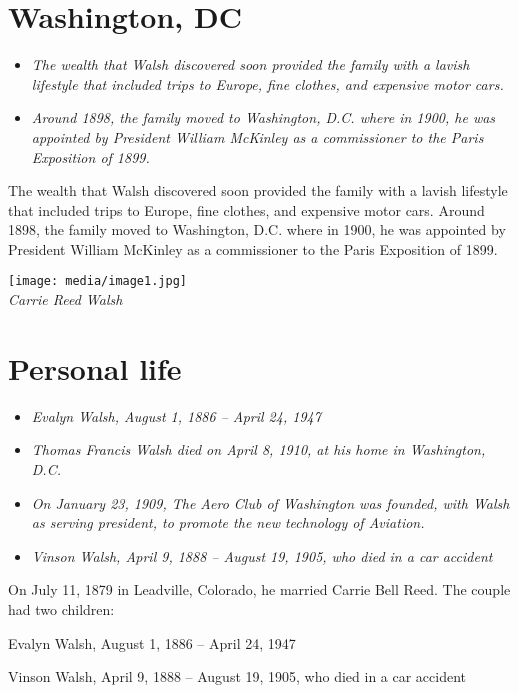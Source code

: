 \section{Washington, DC}\label{washington-dc}

\begin{itemize}
\item
  \emph{The wealth that Walsh discovered soon provided the family with a
  lavish lifestyle that included trips to Europe, fine clothes, and
  expensive motor cars.}
\item
  \emph{Around 1898, the family moved to Washington, D.C. where in 1900,
  he was appointed by President William McKinley as a commissioner to
  the Paris Exposition of 1899.}
\end{itemize}

The wealth that Walsh discovered soon provided the family with a lavish
lifestyle that included trips to Europe, fine clothes, and expensive
motor cars. Around 1898, the family moved to Washington, D.C. where in
1900, he was appointed by President William McKinley as a commissioner
to the Paris Exposition of 1899.

\texttt{[image: media/image1.jpg]}\\
\emph{Carrie Reed Walsh}

\section{Personal life}\label{personal-life}

\begin{itemize}
\item
  \emph{Evalyn Walsh, August 1, 1886 -- April 24, 1947}
\item
  \emph{Thomas Francis Walsh died on April 8, 1910, at his home in
  Washington, D.C.}
\item
  \emph{On January 23, 1909, The Aero Club of Washington was founded,
  with Walsh as serving president, to promote the new technology of
  Aviation.}
\item
  \emph{Vinson Walsh, April 9, 1888 -- August 19, 1905, who died in a
  car accident}
\end{itemize}

On July 11, 1879 in Leadville, Colorado, he married Carrie Bell Reed.
The couple had two children:

Evalyn Walsh, August 1, 1886 -- April 24, 1947

Vinson Walsh, April 9, 1888 -- August 19, 1905, who died in a car
accident

